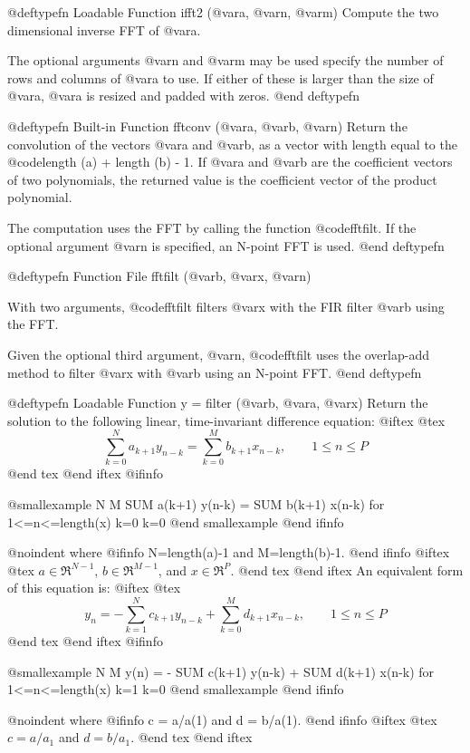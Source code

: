 @deftypefn {Loadable Function} {} ifft2 (@var{a}, @var{n}, @var{m})
Compute the two dimensional inverse FFT of @var{a}.

The optional arguments @var{n} and @var{m} may be used specify the
number of rows and columns of @var{a} to use.  If either of these is
larger than the size of @var{a}, @var{a} is resized and padded with
zeros.
@end deftypefn

@deftypefn {Built-in Function} {} fftconv (@var{a}, @var{b}, @var{n})
Return the convolution of the vectors @var{a} and @var{b}, as a vector
with length equal to the @code{length (a) + length (b) - 1}.  If @var{a}
and @var{b} are the coefficient vectors of two polynomials, the returned
value is the coefficient vector of the product polynomial.

The computation uses the FFT by calling the function @code{fftfilt}.  If
the optional argument @var{n} is specified, an N-point FFT is used.
@end deftypefn

@deftypefn {Function File} {} fftfilt (@var{b}, @var{x}, @var{n})

With two arguments, @code{fftfilt} filters @var{x} with the FIR filter
@var{b} using the FFT.

Given the optional third argument, @var{n}, @code{fftfilt} uses the
overlap-add method to filter @var{x} with @var{b} using an N-point FFT.
@end deftypefn

@deftypefn {Loadable Function} {y =} filter (@var{b}, @var{a}, @var{x})
Return the solution to the following linear, time-invariant difference
equation:
@iftex
@tex
$$
\sum_{k=0}^N a_{k+1} y_{n-k} = \sum_{k=0}^M b_{k+1} x_{n-k}, \qquad
 1 \le n \le P
$$
@end tex
@end iftex
@ifinfo

@smallexample
   N                   M
  SUM a(k+1) y(n-k) = SUM b(k+1) x(n-k)      for 1<=n<=length(x)
  k=0                 k=0
@end smallexample
@end ifinfo

@noindent
where
@ifinfo
 N=length(a)-1 and M=length(b)-1.
@end ifinfo
@iftex
@tex
 $a \in \Re^{N-1}$, $b \in \Re^{M-1}$, and $x \in \Re^P$.
@end tex
@end iftex
An equivalent form of this equation is:
@iftex
@tex
$$
y_n = -\sum_{k=1}^N c_{k+1} y_{n-k} + \sum_{k=0}^M d_{k+1} x_{n-k}, \qquad
 1 \le n \le P
$$
@end tex
@end iftex
@ifinfo

@smallexample
            N                   M
  y(n) = - SUM c(k+1) y(n-k) + SUM d(k+1) x(n-k)  for 1<=n<=length(x)
           k=1                 k=0
@end smallexample
@end ifinfo

@noindent
where
@ifinfo
 c = a/a(1) and d = b/a(1).
@end ifinfo
@iftex
@tex
$c = a/a_1$ and $d = b/a_1$.
@end tex
@end iftex

